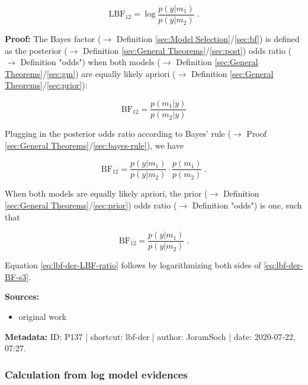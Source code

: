 \documentclass[a4paper,12pt,twoside]{book}
\begin{document}
\begin{equation} \label{eq:lbf-der-LBF-ratio}
\mathrm{LBF}_{12} = \log \frac{p(y|m_1)}{p(y|m_2)} \; .
\end{equation}


\vspace{1em}
\textbf{Proof:} The Bayes factor ($\rightarrow$ Definition \ref{sec:Model Selection}/\ref{sec:bf}) is defined as the posterior ($\rightarrow$ Definition \ref{sec:General Theorems}/\ref{sec:post}) odds ratio ($\rightarrow$ Definition "odds") when both models ($\rightarrow$ Definition \ref{sec:General Theorems}/\ref{sec:gm}) are equally likely apriori ($\rightarrow$ Definition \ref{sec:General Theorems}/\ref{sec:prior}):

\begin{equation} \label{eq:lbf-der-BF-s1}
\mathrm{BF}_{12} = \frac{p(m_1|y)}{p(m_2|y)}
\end{equation}

Plugging in the posterior odds ratio according to Bayes' rule ($\rightarrow$ Proof \ref{sec:General Theorems}/\ref{sec:bayes-rule}), we have

\begin{equation} \label{eq:lbf-der-BF-s2}
\mathrm{BF}_{12} = \frac{p(y|m_1)}{p(y|m_2)} \cdot \frac{p(m_1)}{p(m_2)} \; .
\end{equation}

When both models are equally likely apriori, the prior ($\rightarrow$ Definition \ref{sec:General Theorems}/\ref{sec:prior}) odds ratio ($\rightarrow$ Definition "odds") is one, such that

\begin{equation} \label{eq:lbf-der-BF-s3}
\mathrm{BF}_{12} = \frac{p(y|m_1)}{p(y|m_2)} \; .
\end{equation}

Equation \eqref{eq:lbf-der-LBF-ratio} follows by logarithmizing both sides of \eqref{eq:lbf-der-BF-s3}.


\vspace{1em}
\textbf{Sources:}
\begin{itemize}
\item original work\end{itemize}


\vspace{1em}
\textbf{Metadata:} ID: P137 | shortcut: lbf-der | author: JoramSoch | date: 2020-07-22, 07:27.
\vspace{1em}



\subsubsection[\textbf{Calculation from log model evidences}]{Calculation from log model evidences} \label{sec:lbf-lme}
\setcounter{equation}{0}
\end{document}
